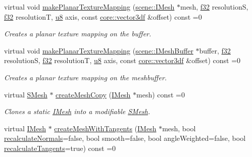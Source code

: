 \begin{DoxyCompactItemize}
virtual void \hyperlink{classirr_1_1scene_1_1IMeshManipulator_abc1b4ae56f126e8466ba6f6634a0f723}{make\+Planar\+Texture\+Mapping} (\hyperlink{classirr_1_1scene_1_1IMesh}{scene\+::\+I\+Mesh} $\ast$mesh, \hyperlink{namespaceirr_a0277be98d67dc26ff93b1a6a1d086b07}{f32} resolutionS, \hyperlink{namespaceirr_a0277be98d67dc26ff93b1a6a1d086b07}{f32} resolutionT, \hyperlink{namespaceirr_a646874f69af8ff87fc10201b0254a761}{u8} axis, const \hyperlink{namespaceirr_1_1core_a06f169d08b5c429f5575acb7edbad811}{core\+::vector3df} \&offset) const =0
\begin{DoxyCompactList}\small\item\em Creates a planar texture mapping on the buffer. \end{DoxyCompactList}\item 
virtual void \hyperlink{classirr_1_1scene_1_1IMeshManipulator_a28c9aaddc04baa710138a065457f9df1}{make\+Planar\+Texture\+Mapping} (\hyperlink{classirr_1_1scene_1_1IMeshBuffer}{scene\+::\+I\+Mesh\+Buffer} $\ast$buffer, \hyperlink{namespaceirr_a0277be98d67dc26ff93b1a6a1d086b07}{f32} resolutionS, \hyperlink{namespaceirr_a0277be98d67dc26ff93b1a6a1d086b07}{f32} resolutionT, \hyperlink{namespaceirr_a646874f69af8ff87fc10201b0254a761}{u8} axis, const \hyperlink{namespaceirr_1_1core_a06f169d08b5c429f5575acb7edbad811}{core\+::vector3df} \&offset) const =0
\begin{DoxyCompactList}\small\item\em Creates a planar texture mapping on the meshbuffer. \end{DoxyCompactList}\item 
virtual \hyperlink{structirr_1_1scene_1_1SMesh}{S\+Mesh} $\ast$ \hyperlink{classirr_1_1scene_1_1IMeshManipulator_a3d2e7401f1d43919834a1bfe0b65e77f}{create\+Mesh\+Copy} (\hyperlink{classirr_1_1scene_1_1IMesh}{I\+Mesh} $\ast$mesh) const =0
\begin{DoxyCompactList}\small\item\em Clones a static \hyperlink{classirr_1_1scene_1_1IMesh}{I\+Mesh} into a modifiable \hyperlink{structirr_1_1scene_1_1SMesh}{S\+Mesh}. \end{DoxyCompactList}\item 
virtual \hyperlink{classirr_1_1scene_1_1IMesh}{I\+Mesh} $\ast$ \hyperlink{classirr_1_1scene_1_1IMeshManipulator_ab849bd2c83b206de1e5da19ce3481e35}{create\+Mesh\+With\+Tangents} (\hyperlink{classirr_1_1scene_1_1IMesh}{I\+Mesh} $\ast$mesh, bool \hyperlink{classirr_1_1scene_1_1IMeshManipulator_a8dba16b7eedeac07761c9c1247944429}{recalculate\+Normals}=false, bool smooth=false, bool angle\+Weighted=false, bool \hyperlink{classirr_1_1scene_1_1IMeshManipulator_a0ea43e8c4e8489551228b3005d325cd6}{recalculate\+Tangents}=true) const =0

\end{DoxyCompactItemize}
